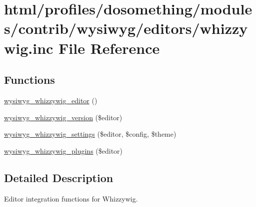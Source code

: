 \hypertarget{whizzywig_8inc}{
\section{html/profiles/dosomething/modules/contrib/wysiwyg/editors/whizzywig.inc File Reference}
\label{whizzywig_8inc}
}
\subsection*{Functions}
\begin{DoxyCompactItemize}
\item 
\hyperlink{whizzywig_8inc_ab6a3e4d8afc5d0daef2ae850f08d965f}{wysiwyg\_\-whizzywig\_\-editor} ()
\item 
\hyperlink{whizzywig_8inc_a97c05de4cd3a5018b3556518f3439b94}{wysiwyg\_\-whizzywig\_\-version} (\$editor)
\item 
\hyperlink{whizzywig_8inc_a362242dd00c80df7688e7923bcc42ab9}{wysiwyg\_\-whizzywig\_\-settings} (\$editor, \$config, \$theme)
\item 
\hyperlink{whizzywig_8inc_a64bde943bdb256a00b6b26bb51fe2965}{wysiwyg\_\-whizzywig\_\-plugins} (\$editor)
\end{DoxyCompactItemize}


\subsection{Detailed Description}
Editor integration functions for Whizzywig. 


